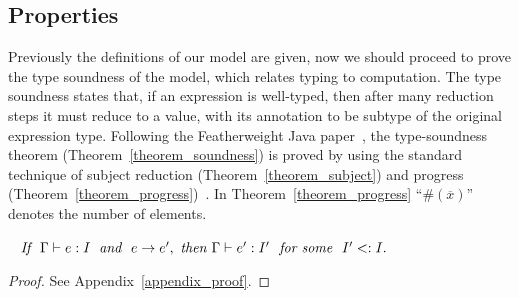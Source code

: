 \begin{comment}
\begin{figure*}[t]
\begin{mathpar}
\end{mathpar}
\caption{Congruence.}\label{fig:congruence}
\end{figure*}
\end{comment}


\subsection{Properties}
Previously the definitions of our model are given, now we should proceed to prove the type soundness of 
the model, which relates typing to computation. The type soundness states that, if an expression is 
well-typed, then after many reduction steps it must reduce to a value, with its annotation to be subtype of the original expression type.
Following the Featherweight Java paper~\cite{Igarashi01FJ}, the type-soundness theorem 
(Theorem~\ref{theorem_soundness}) is proved by using the standard technique of subject reduction (Theorem~\ref{theorem_subject})
and progress (Theorem~\ref{theorem_progress})~\cite{Wright1994}. In Theorem~\ref{theorem_progress} ``$\#(\overline{x})$'' denotes the number of
elements.

\begin{theorem}~\label{theorem_subject}
$\textit{If } \ \judgeewf \Gamma {e : I} \; \textit{ and } \ e \rightarrow e',\ 
\textit{then } \judgeewf \Gamma {e' : I'} \ \textit{ for some } \ I' <: I.$
\end{theorem}
\begin{proof}
See Appendix~\ref{appendix_proof}.
\end{proof}

